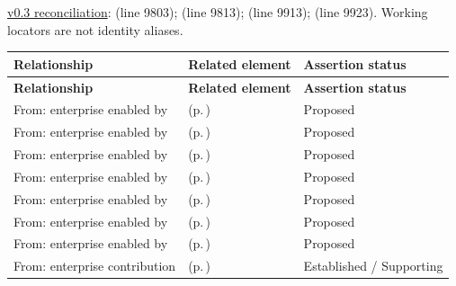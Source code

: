 \hyperref[model:reconciliation]{v0.3 reconciliation}: \texttt{} (line 9803); \texttt{} (line 9813); \texttt{} (line 9913); \texttt{} (line 9923). Working locators are not identity aliases.
\begingroup\small\setlength{\TableWidth}{\dimexpr\linewidth-6\tabcolsep-4\arrayrulewidth\relax}
\begin{longtable}{|>{\raggedright\arraybackslash}p{0.27\TableWidth}|>{\raggedright\arraybackslash}p{0.48\TableWidth}|>{\raggedright\arraybackslash}p{0.25\TableWidth}|}
\hline\rowcolor{TableHead}\textbf{Relationship} & \textbf{Related element} & \textbf{Assertion status}\\\hline\endfirsthead
\hline\rowcolor{TableHead}\textbf{Relationship} & \textbf{Related element} & \textbf{Assertion status}\\\hline\endhead
\hline\endfoot
From: enterprise enabled by & \nameref{cap:bec-person-identity} (p.\,\pageref{cap:bec-person-identity}) & Proposed\\\hline
From: enterprise enabled by & \nameref{cap:bec-healthcare-subject} (p.\,\pageref{cap:bec-healthcare-subject}) & Proposed\\\hline
From: enterprise enabled by & \nameref{cap:bec-provider-administration} (p.\,\pageref{cap:bec-provider-administration}) & Proposed\\\hline
From: enterprise enabled by & \nameref{cap:bec-organisation-administration} (p.\,\pageref{cap:bec-organisation-administration}) & Proposed\\\hline
From: enterprise enabled by & \nameref{cap:bec-location-administration} (p.\,\pageref{cap:bec-location-administration}) & Proposed\\\hline
From: enterprise enabled by & \nameref{cap:bec-health-service-administration} (p.\,\pageref{cap:bec-health-service-administration}) & Proposed\\\hline
From: enterprise enabled by & \nameref{cap:bec-clinical-device-administration} (p.\,\pageref{cap:bec-clinical-device-administration}) & Proposed\\\hline
From: enterprise contribution & \nameref{cap:bec-assurance-design} (p.\,\pageref{cap:bec-assurance-design}) & Established / Supporting\\\hline
\end{longtable}\endgroup

